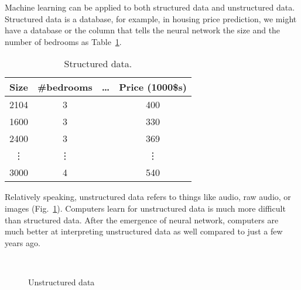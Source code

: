 \documentclass[a4paper]{article}
\begin{document}
\par
Machine learning can be applied to both structured data and unstructured data. Structured data is a database, for example, in housing price prediction, we might have a database or the column that tells the neural network the size and the number of bedrooms as Table~\ref{tab2}\cite{note}. 
\begin{table}
\small
\renewcommand\arraystretch{1.2}
\centering
\begin{tabular}{|c|c|c|c|}
\hline
Size & \#bedrooms & \dots & Price (1000\$s) \\
\hline
2104 & 3 &  & 400 \\

1600 & 3 &  & 330 \\

2400 & 3 &  & 369 \\ 

\vdots & \vdots &  & \vdots \\

3000 & 4 &  & 540 \\
\hline
\end{tabular} 
\caption{Structured data.} 
\label{tab2}
\end{table} 
\par
Relatively speaking, unstructured data refers to things like audio, raw audio, or images (Fig.~\ref{3}). Computers learn for unstructured data is much more difficult than structured data. After the emergence of neural network, computers are  much better at interpreting unstructured data as well compared to just a few years ago.
\par
\begin{figure}[!htb]
    \centering
    \quad
     \\
    \caption{Unstructured data}
    \label{3}
\end{figure}
\end{document}
